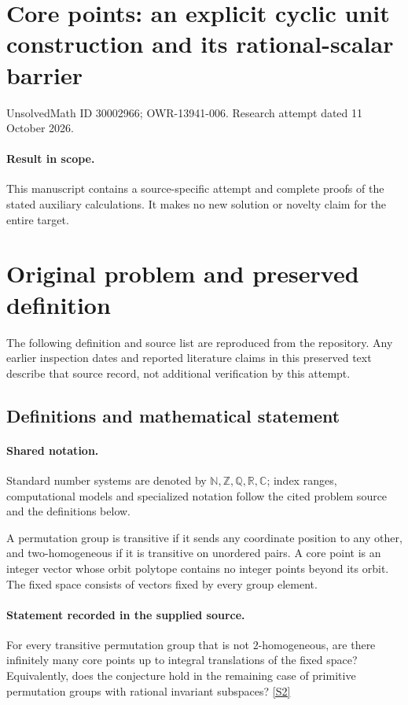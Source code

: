 \documentclass[11pt]{article}
\begin{document}
\section*{Core points: an explicit cyclic unit construction and its rational-scalar barrier}
\noindent UnsolvedMath ID 30002966; OWR-13941-006. Research attempt dated 11 October 2026.
\paragraph{Result in scope.}This manuscript contains a source-specific attempt and complete proofs of the stated auxiliary calculations. It makes no new solution or novelty claim for the entire target.
\section{Original problem and preserved definition}
The following definition and source list are reproduced from the repository. Any earlier inspection dates and reported literature claims in this preserved text describe that source record, not additional verification by this attempt.
\subsection{Definitions and mathematical statement}

\paragraph{Shared notation.}Standard number systems are denoted by $\mathbb N,\mathbb Z,\mathbb Q,\mathbb R,\mathbb C$; index ranges, computational models and specialized notation follow the cited problem source and the definitions below.


A permutation group is transitive if it sends any coordinate position to any other, and two-homogeneous if it is transitive on unordered pairs. A core point is an integer vector whose orbit polytope contains no integer points beyond its orbit. The fixed space consists of vectors fixed by every group element.
\paragraph{Statement recorded in the supplied source.}
For every transitive permutation group that is not $2$-homogeneous, are there infinitely many core points up to integral translations of the fixed space? Equivalently, does the conjecture hold in the remaining case of primitive permutation groups with rational invariant subspaces? \href{https://doi.org/10.4171/owr/2015/46}{[S2]}
\end{document}
